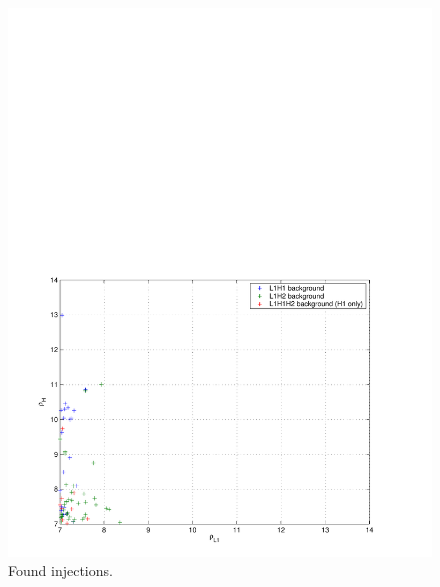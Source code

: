 \begin{figure}[p]
\begin{center}
\includegraphics[width=\textwidth]{figures/result/bkg}
\end{center}
\caption{\label{f:inj_bkg_snr}%
Found injections.
}
\end{figure}

